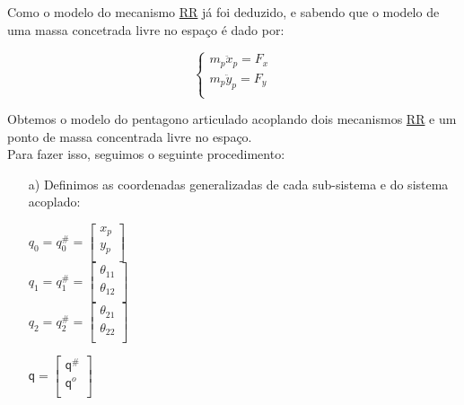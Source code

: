 \documentclass[12pt,a4paper]{article}
\begin{document}
\begin{itemize}
Como o modelo do mecanismo \underline{R}\underline{R} já foi deduzido, e sabendo que o modelo de uma massa concetrada livre no espaço é dado por:

\begin{equation}
\begin{cases}
m_p \ddot{x}_p = F_x \\
m_p \ddot{y}_p = F_y \\
\end{cases}
\end{equation}

Obtemos o modelo do pentagono articulado acoplando dois mecanismos \underline{R}\underline{R} e um ponto de massa concentrada livre no espaço. \\

Para fazer isso, seguimos o seguinte procedimento:

\begin{itemize}
	\item[a)] Definimos as coordenadas generalizadas de cada sub-sistema e do sistema acoplado:
	
	\begin{multicols}{3}
	$ q_0 = q_0^{\#} =
	\begin{bmatrix}
	x_p \\
	y_p \\
	\end{bmatrix}	 $ \\
	
	$ q_1 = q_1^{\#} =
	\begin{bmatrix}
	\theta_{11} \\
	\theta_{12} \\
	\end{bmatrix}	 $ \\
	
	$ q_2 = q_2^{\#} =
	\begin{bmatrix}
	\theta_{21} \\
	\theta_{22} \\
	\end{bmatrix}	 $ \\
	\end{multicols}
	
	\begin{multicols}{3}
	$ \mathsf{q} =
	\begin{bmatrix}
	\mathsf{q}^{\#} \\
	\mathsf{q}^o \\
	\end{bmatrix} $ \\
	

\end{multicols}
\end{itemize}
\end{itemize}
\end{document}

